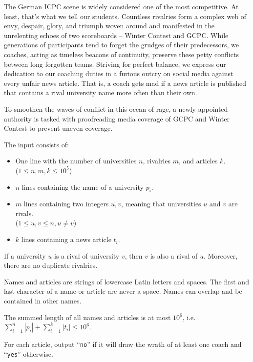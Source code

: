 
%
The German ICPC scene is widely considered one of the most competitive.
At least, that's what we tell our students.
Countless rivalries form a complex web of envy, despair, glory, and triumph woven around and manifested in the unrelenting echoes of two scoreboards -- Winter Contest and GCPC.
While generations of participants tend to forget the grudges of their predecessors, we coaches, acting as timeless beacons of continuity, preserve these petty conflicts between long forgotten teams.
Striving for perfect balance, we express our dedication to our coaching duties in a furious outcry on social media against every unfair news article.
That is, a coach gets mad if a news article is published that contains a rival university name more often than their own. 

To smoothen the waves of conflict in this ocean of rage, a newly appointed authority is tasked with proofreading media coverage of GCPC and Winter Contest to prevent uneven coverage.

%

\begin{Input}
The input consists of:
\begin{itemize}
    \item One line with the number of universities $n$, rivalries $m$, and articles $k$. \\
    ($1\leq n,m,k\leq 10^5$)
    \item $n$ lines containing the name of a university $p_i$.
    \item $m$ lines containing two integers $u,v$, meaning that universities $u$ and $v$ are rivals. \\
    ($1\leq u,v \leq n, u\neq v$)
    \item $k$ lines containing a news article $t_i$.
\end{itemize}

If a university $u$ is a rival of university $v$, then $v$ is also a rival of $u$. Moreover, there are no duplicate rivalries.

Names and articles are strings of lowercase Latin letters and spaces.
The first and last character of a name or article are never a space.
Names can overlap and be contained in other names.

The summed length of all names and articles is at most $10^6$, i.e. $\sum_{i=1}^{n} |p_i| + \sum_{i=1}^{k} |t_i| \leq 10^6$.
\end{Input}

\begin{Output}
For each article, output ``\texttt{no}'' if it will draw the wrath of at least one coach and ``\texttt{yes}'' otherwise.
\end{Output}
